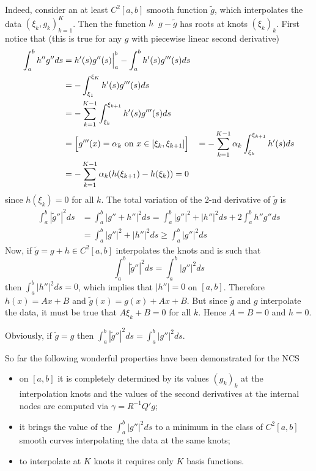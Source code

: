 \documentclass[a4paper]{article}
\newcommand{\defn}{\mathop{\overset{\Delta}{=}}\nolimits}
\begin{document}
Indeed, consider an at least $C^2[a,b]$ smooth function $\tilde{g}$, which interpolates
the data $(\xi_k, g_k)_{k=1}^K$. Then the function $h \defn g - \tilde{g}$ has roots at
knots $(\xi_k)_k$. First notice that (this is true for any $g$ with piecewise linear
second derivative)
\begin{align*}
	\int_a^b h'' g'' ds
	& = \Bigl. h'(s) g''(s)\Bigr\rvert_a^b - \int_a^b h'(s) g'''(s) ds \\
	& = - \int_{\xi_1}^{\xi_K} h'(s) g'''(s) ds \\
	& = - \sum_{k=1}^{K-1} \int_{\xi_k}^{\xi_{k+1}} h'(s) g'''(s) ds \\
	& = \Bigl[g'''(x) = \alpha_k\text{ on } x\in[\xi_k, \xi_{k+1}]\Bigr]
	& = - \sum_{k=1}^{K-1}  \alpha_k \int_{\xi_k}^{\xi_{k+1}} h'(s) ds \\
	& = - \sum_{k=1}^{K-1}  \alpha_k (h(\xi_{k+1})-h(\xi_k)) = 0
\end{align*}
since $h(\xi_k)=0$ for all $k$. The total variation of the $2$-nd derivative
of $\tilde{g}$ is
\begin{align*}
	\int_a^b |\tilde{g}''|^2 ds
	&= \int_a^b \bigl|g'' + h''\bigr|^2 ds
	= \int_a^b |g''|^2 + |h''|^2 ds + 2 \int_a^b h'' g'' ds\\
	&= \int_a^b |g''|^2 + |h''|^2 ds \geq \int_a^b |g''|^2 ds
\end{align*}
Now, if $\tilde{g} = g+h \in C^2[a,b]$ interpolates the knots and is such that
\[\int_a^b |\tilde{g}''|^2 ds = \int_a^b |g''|^2 ds\]
then $\int_a^b |h''|^2 ds = 0$, which implies that $|h''|=0$ on $[a,b]$. Therefore
$h(x)=Ax + B$ and $\tilde{g}(x) = g(x) + A x + B$. But since $\tilde{g}$ and $g$
interpolate the data, it must be true that $A \xi_k + B = 0$ for all $k$. Hence
$A=B=0$ and $h=0$.

Obviously, if $\tilde{g}=g$ then $\int_a^b |\tilde{g}''|^2 ds=\int_a^b |g''|^2 ds$.

So far the following wonderful properties have been demonstrated for the NCS
\begin{itemize}
	\item on $[a,b]$ it is completely determined by its values $(g_k)_k$ at
	the interpolation knots and the values of the second derivatives at the
	internal nodes are computed via $\gamma = R^{-1}Q'g$;
	\item it brings the value of the $\int_a^b |g''|^2 ds$ to a minimum in the class
	of $C^2[a,b]$ smooth curves interpolating the data at the same knots;
	\item to interpolate at $K$ knots it requires only $K$ basis functions.
\end{itemize}
\end{document}
